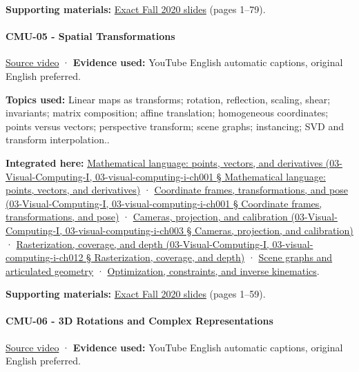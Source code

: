\textbf{Supporting materials:} \href{https://15462.courses.cs.cmu.edu/fall2020content/lectures/04_drawingatriangle/04_drawingatriangle_slides.pdf}{Exact Fall 2020 slides} (pages 1--79).

\paragraph{CMU-05 - Spatial Transformations}\label{cmu-05---spatial-transformations}

\href{https://www.youtube.com/watch?v=QmFBHSJS0Gw}{Source video} · \textbf{Evidence used:} YouTube English automatic captions, original English preferred.

\textbf{Topics used:} Linear maps as transforms; rotation, reflection, scaling, shear; invariants; matrix composition; affine translation; homogeneous coordinates; points versus vectors; perspective transform; scene graphs; instancing; SVD and transform interpolation..

\textbf{Integrated here:} \href{}{Mathematical language: points, vectors, and derivatives (03-Visual-Computing-I, 03-visual-computing-i-ch001 § Mathematical language: points, vectors, and derivatives)} · \href{}{Coordinate frames, transformations, and pose (03-Visual-Computing-I, 03-visual-computing-i-ch001 § Coordinate frames, transformations, and pose)} · \href{}{Cameras, projection, and calibration (03-Visual-Computing-I, 03-visual-computing-i-ch003 § Cameras, projection, and calibration)} · \href{}{Rasterization, coverage, and depth (03-Visual-Computing-I, 03-visual-computing-i-ch012 § Rasterization, coverage, and depth)} · \hyperref[04-visual-computing-ii-ch029]{Scene graphs and articulated geometry} · \hyperref[04-visual-computing-ii-ch029]{Optimization, constraints, and inverse kinematics}.

\textbf{Supporting materials:} \href{https://15462.courses.cs.cmu.edu/fall2020content/lectures/05_transformations/05_transformations_slides.pdf}{Exact Fall 2020 slides} (pages 1--59).

\paragraph{CMU-06 - 3D Rotations and Complex Representations}\label{cmu-06---3d-rotations-and-complex-representations}

\href{https://www.youtube.com/watch?v=YF5ZUlKxSgE}{Source video} · \textbf{Evidence used:} YouTube English automatic captions, original English preferred.

